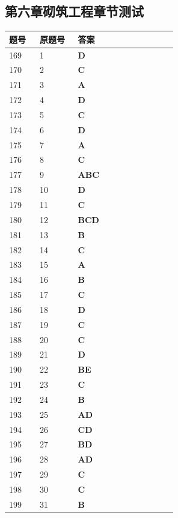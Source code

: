 \documentclass[UTF8,fontset=windows,11pt]{ctexart}
\begin{document}
\subsection*{第六章砌筑工程章节测试}
\begin{longtable}{p{0.16\linewidth}p{0.2\linewidth}p{0.52\linewidth}}
\textbf{\textcolor{examnavy}{题号}} & \textbf{\textcolor{examnavy}{原题号}} & \textbf{\textcolor{answergreen}{答案}} \\
\hline
169 & 1 & \textbf{\textcolor{answergreen}{D}} \\
170 & 2 & \textbf{\textcolor{answergreen}{C}} \\
171 & 3 & \textbf{\textcolor{answergreen}{A}} \\
172 & 4 & \textbf{\textcolor{answergreen}{D}} \\
173 & 5 & \textbf{\textcolor{answergreen}{C}} \\
174 & 6 & \textbf{\textcolor{answergreen}{D}} \\
175 & 7 & \textbf{\textcolor{answergreen}{A}} \\
176 & 8 & \textbf{\textcolor{answergreen}{C}} \\
177 & 9 & \textbf{\textcolor{answergreen}{ABC}} \\
178 & 10 & \textbf{\textcolor{answergreen}{D}} \\
179 & 11 & \textbf{\textcolor{answergreen}{C}} \\
180 & 12 & \textbf{\textcolor{answergreen}{BCD}} \\
181 & 13 & \textbf{\textcolor{answergreen}{B}} \\
182 & 14 & \textbf{\textcolor{answergreen}{C}} \\
183 & 15 & \textbf{\textcolor{answergreen}{A}} \\
184 & 16 & \textbf{\textcolor{answergreen}{B}} \\
185 & 17 & \textbf{\textcolor{answergreen}{C}} \\
186 & 18 & \textbf{\textcolor{answergreen}{D}} \\
187 & 19 & \textbf{\textcolor{answergreen}{C}} \\
188 & 20 & \textbf{\textcolor{answergreen}{C}} \\
189 & 21 & \textbf{\textcolor{answergreen}{D}} \\
190 & 22 & \textbf{\textcolor{answergreen}{BE}} \\
191 & 23 & \textbf{\textcolor{answergreen}{C}} \\
192 & 24 & \textbf{\textcolor{answergreen}{B}} \\
193 & 25 & \textbf{\textcolor{answergreen}{AD}} \\
194 & 26 & \textbf{\textcolor{answergreen}{CD}} \\
195 & 27 & \textbf{\textcolor{answergreen}{BD}} \\
196 & 28 & \textbf{\textcolor{answergreen}{AD}} \\
197 & 29 & \textbf{\textcolor{answergreen}{C}} \\
198 & 30 & \textbf{\textcolor{answergreen}{C}} \\
199 & 31 & \textbf{\textcolor{answergreen}{B}} \\
\end{longtable}
\vspace{0.4em}
\end{document}
